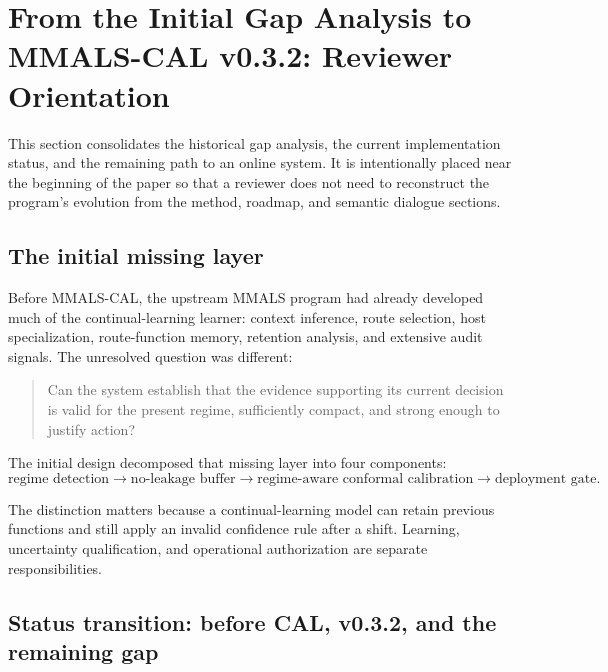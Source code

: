 \section{From the Initial Gap Analysis to MMALS-CAL v0.3.2: Reviewer Orientation}\label{sec:gap-to-v032}

This section consolidates the historical gap analysis, the current implementation status, and the remaining path to an online system. It is intentionally placed near the beginning of the paper so that a reviewer does not need to reconstruct the program's evolution from the method, roadmap, and semantic dialogue sections.

\subsection{The initial missing layer}

Before MMALS-CAL, the upstream MMALS program had already developed much of the continual-learning learner: context inference, route selection, host specialization, route-function memory, retention analysis, and extensive audit signals. The unresolved question was different:

\begin{quote}
Can the system establish that the evidence supporting its current decision is valid for the present regime, sufficiently compact, and strong enough to justify action?
\end{quote}

The initial design decomposed that missing layer into four components:
\begin{equation}
\text{regime detection}\rightarrow\text{no-leakage buffer}\rightarrow\text{regime-aware conformal calibration}\rightarrow\text{deployment gate}.
\end{equation}

The distinction matters because a continual-learning model can retain previous functions and still apply an invalid confidence rule after a shift. Learning, uncertainty qualification, and operational authorization are separate responsibilities.

\subsection{Status transition: before CAL, v0.3.2, and the remaining gap}

